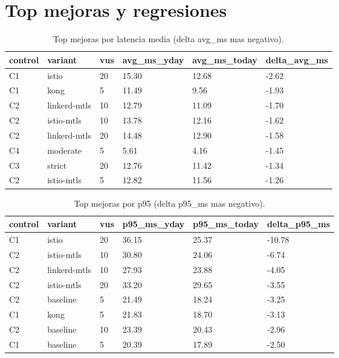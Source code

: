 \documentclass[11pt]{article}
\begin{document}
\section*{Top mejoras y regresiones}
\begin{table}[h]
\centering
\small
\begin{tabular}{llllll}
\hline
control & variant & vus & avg\_ms\_yday & avg\_ms\_today & delta\_avg\_ms \\
\hline
C1 & istio & 20 & 15.30 & 12.68 & -2.62 \\
C1 & kong & 5 & 11.49 & 9.56 & -1.93 \\
C2 & linkerd-mtls & 10 & 12.79 & 11.09 & -1.70 \\
C2 & istio-mtls & 10 & 13.78 & 12.16 & -1.62 \\
C2 & linkerd-mtls & 20 & 14.48 & 12.90 & -1.58 \\
C4 & moderate & 5 & 5.61 & 4.16 & -1.45 \\
C3 & strict & 20 & 12.76 & 11.42 & -1.34 \\
C2 & istio-mtls & 5 & 12.82 & 11.56 & -1.26 \\
\hline
\end{tabular}
\caption{Top mejoras por latencia media (delta avg\_ms mas negativo).}
\label{tab:top_avg}
\end{table}

\begin{table}[h]
\centering
\small
\begin{tabular}{llllll}
\hline
control & variant & vus & p95\_ms\_yday & p95\_ms\_today & delta\_p95\_ms \\
\hline
C1 & istio & 20 & 36.15 & 25.37 & -10.78 \\
C2 & istio-mtls & 10 & 30.80 & 24.06 & -6.74 \\
C2 & linkerd-mtls & 10 & 27.93 & 23.88 & -4.05 \\
C2 & istio-mtls & 20 & 33.20 & 29.65 & -3.55 \\
C2 & baseline & 5 & 21.49 & 18.24 & -3.25 \\
C1 & kong & 5 & 21.83 & 18.70 & -3.13 \\
C2 & baseline & 10 & 23.39 & 20.43 & -2.96 \\
C1 & baseline & 5 & 20.39 & 17.89 & -2.50 \\
\hline
\end{tabular}
\caption{Top mejoras por p95 (delta p95\_ms mas negativo).}
\label{tab:top_p95}
\end{table}
\end{document}
